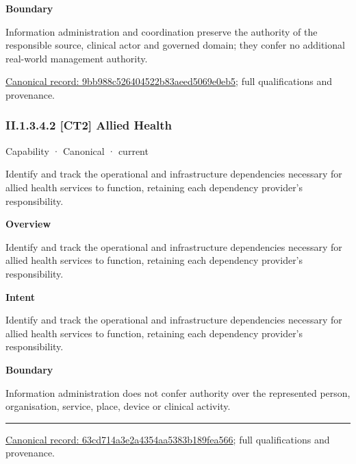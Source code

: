 \textbf{Boundary}



Information administration and coordination preserve the authority of the responsible source, clinical actor and governed domain; they confer no additional real-world management authority.


{\footnotesize \href{../../../../continuum/strategy/capability/9bb988c526404522b83aeed5069e0eb5.md}{Canonical record: 9bb988c526404522b83aeed5069e0eb5}; full qualifications and provenance.}\par
\subsubsection*{II.1.3.4.2 [CT2] Allied Health}
\label{navigation:II.1.3.4.2}

\label{element:63cd714a3e2a4354aa5383b189fea566}
{\small Capability · Canonical · current}\par

Identify and track the operational and infrastructure dependencies necessary for allied health services to function, retaining each dependency provider's responsibility.



\textbf{Overview}



Identify and track the operational and infrastructure dependencies necessary for allied health services to function, retaining each dependency provider's responsibility.



\textbf{Intent}



Identify and track the operational and infrastructure dependencies necessary for allied health services to function, retaining each dependency provider's responsibility.



\textbf{Boundary}



Information administration does not confer authority over the represented person, organisation, service, place, device or clinical activity.



\medskip\hrule\medskip

{\footnotesize \href{../../../../continuum/strategy/capability/63cd714a3e2a4354aa5383b189fea566.md}{Canonical record: 63cd714a3e2a4354aa5383b189fea566}; full qualifications and provenance.}\par
